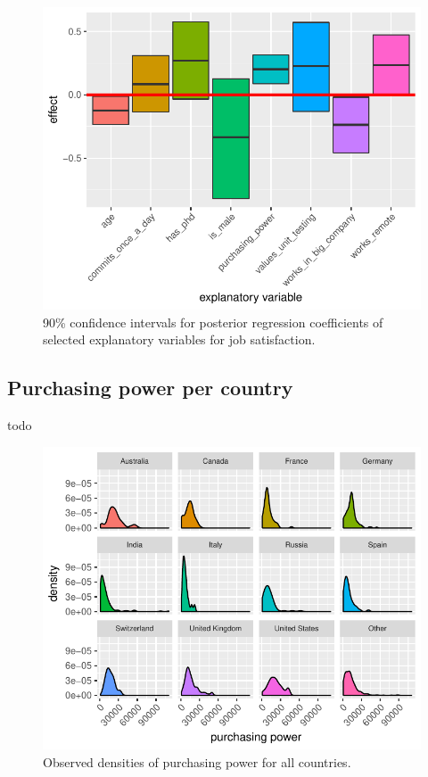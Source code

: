 \documentclass{article}
\begin{document}
\begin{figure}[H]
\centering
\includegraphics{report-021}
\caption{90\% confidence intervals for posterior regression coefficients of selected explanatory variables for job satisfaction.}\label{fig_5}
\end{figure}

\subsection{Purchasing power per country}
todo


\begin{figure}[H]
\centering
\includegraphics{report-023}
\caption{Observed densities of purchasing power for all countries.}\label{fig_6}
\end{figure}
\end{document}
